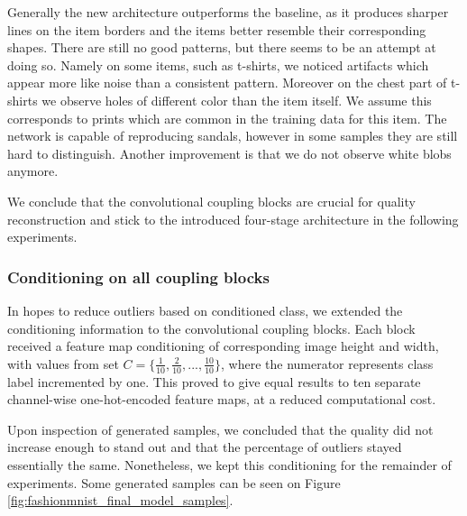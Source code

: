 \documentclass[final]{cvpr}
\begin{document}
Generally the new architecture outperforms the baseline, as it produces sharper lines on the item borders and the items better resemble their corresponding shapes. There are still no good patterns, but there seems to be an attempt at doing so. Namely on some items, such as t-shirts, we noticed artifacts which appear more like noise than a consistent pattern. Moreover on the chest part of t-shirts we observe holes of different color than the item itself. We assume this corresponds to prints which are common in the training data for this item. The network is capable of reproducing sandals, however in some samples they are still hard to distinguish. Another improvement is that we do not observe white blobs anymore.

We conclude that the convolutional coupling blocks are crucial for quality reconstruction and stick to the introduced four-stage architecture in the following experiments.

\subsubsection{Conditioning on all coupling blocks}\label{sec:experiment_condition_on_all_ccs}
In hopes to reduce outliers based on conditioned class, we extended the conditioning information to the convolutional coupling blocks. Each block received a feature map conditioning of corresponding image height and width, with values from set $C = \{\frac{1}{10}, \frac{2}{10}, ..., \frac{10}{10}\}$, where the numerator represents class label incremented by one. This proved to give equal results to ten separate channel-wise one-hot-encoded feature maps, at a reduced computational cost.

Upon inspection of generated samples, we concluded that the quality did not increase enough to stand out and that the percentage of outliers stayed essentially the same. Nonetheless, we kept this conditioning for the remainder of experiments. Some generated samples can be seen on Figure \ref{fig:fashionmnist_final_model_samples}.
\end{document}
